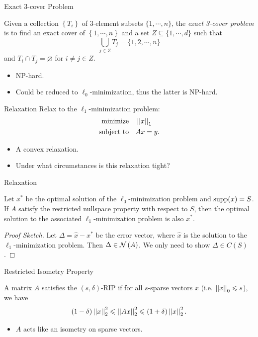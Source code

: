 \documentclass{beamer}
\begin{document}
\begin{frame}{Exact 3-cover Problem}
    \begin{definition}
        Given a collection \(\left\{T_i\right\}\) of \(3\)-element subsets \(\{1,\cdots,n\}\), the \emph{exact 3-cover problem} is to find an exact cover of \(\left\{1,\cdots,n\right\}\) and a set \(Z\subseteq\{1,\cdots,d\}\) such that
        \[\bigcup_{j\in Z}T_j=\{1,2,\cdots,n\}\]
        and \(T_i\cap T_j=\varnothing\) for \(i\neq j\in Z\).
    \end{definition}
    \begin{itemize}
        \item NP-hard.
        \item Could be reduced to \(\ell_0\)-minimization, thus the latter is NP-hard.
    \end{itemize}
\end{frame}

\begin{frame}{Relaxation}
    Relax to the \(\ell_1\)-minimization problem:
    \[\begin{aligned}
        \textnormal{minimize}\quad & \left|\left|x\right|\right|_1\\
        \textnormal{subject to}\quad & Ax=y.
    \end{aligned}\]
    \begin{itemize}
        \item A convex relaxation.
        \item Under what circumstances is this relaxation tight?
    \end{itemize}
\end{frame}

\begin{frame}{Relaxation}
    \begin{theorem}
        Let \(x^\ast\) be the optimal solution of the \(\ell_0\)-minimization problem and \(\operatorname{supp}(x)=S\). If \(A\) satisfy the restricted nullspace property with respect to \(S\), then the optimal solution to the associated \(\ell_1\)-minimization problem is also \(x^\ast\).
    \end{theorem}
    \begin{proof}[Proof Sketch]
        Let \(\Delta=\widehat x-x^\ast\) be the error vector, where \(\widehat x\) is the solution to the \(\ell_1\)-minimization problem. Then \(\Delta\in\mathcal N\left(A\right)\). We only need to show \(\Delta\in C(S)\).
    \end{proof}
\end{frame}

\begin{frame}{Restricted Isometry Property}
    \begin{definition}
        A matrix \(A\) satisfies the \((s,\delta)\)-RIP if for all \(s\)-sparse vectors \(x\) (i.e. \(\left|\left|x\right|\right|_0\leqslant s\)), we have
        \[(1-\delta)\left|\left|x\right|\right|_2^2\leqslant\left|\left|Ax\right|\right|_2^2\leqslant(1+\delta)\left|\left|x\right|\right|_2^2.\]
    \end{definition}
    \begin{itemize}
        \item \(A\) acts like an isometry on sparse vectors.
    \end{itemize}
\end{frame}
\end{document}
